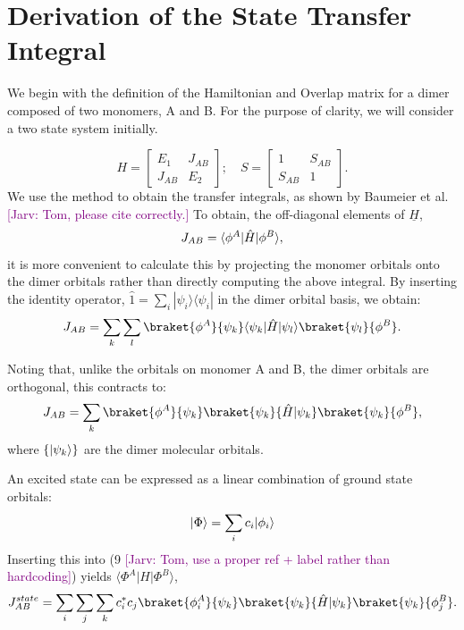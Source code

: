 \documentclass[aps,physrev,reprint,superscriptaddress,nofootinbib,amsmath,amssymb,a4paper]{revtex4-2}
\DeclarePairedDelimiter\bra{\langle}{\rvert}
\DeclarePairedDelimiter\ket{\lvert}{\rangle}
\newcommand{\jarv}[1]{\textcolor{purple}{[Jarv: #1]}}
\begin{document}
\section{Derivation of the State Transfer Integral}\label{Derivation}
We begin with the definition of the Hamiltonian and Overlap matrix for a dimer composed of two monomers, A and B. For the purpose of clarity, we will consider a two state system initially. 


\begin{equation}
    H = 
    \begin{bmatrix}
        E_1&J_{AB}\\
        J_{AB} &E_2
    \end{bmatrix}
    ; \quad  S = 
        \begin{bmatrix}
        1&S_{AB}\\
        S_{AB} &1
    \end{bmatrix}.
\end{equation}
We use the method to obtain the transfer integrals, as shown by Baumeier et al. \jarv{Tom, please cite correctly.} To obtain, the off-diagonal elements of $\underline{H}$,
\begin{equation}
    J_{AB} =\bra{\phi^A}\hat{H}\ket{\phi^B},
\end{equation}
it is more convenient to calculate this by projecting the monomer orbitals onto the dimer orbitals rather than directly computing the above integral. By inserting the identity operator, $\hat{1}= \sum_i|\psi_i\rangle\langle\psi_i|$ in the dimer orbital basis, we obtain:
\begin{equation}
    J_{AB} = \sum_k\sum_l \braket{\phi^A}{\psi_k}\bra{\psi_k}\hat{H}\ket{\psi_l}\braket{\psi_l}{\phi^B}.
\end{equation}

Noting that, unlike the orbitals on monomer A and B, the dimer orbitals are orthogonal, this contracts to:
\begin{equation}
    J_{AB} =\sum_k\braket{\phi^A}{\psi_k}\braket{\psi_k}{\hat{H}|\psi_k}\braket{\psi_k}{\phi^B}, 
\end{equation}
where $\{ \ket{\psi_k} \}$ are the dimer molecular orbitals.

An excited state can be expressed as a linear combination of ground state orbitals:
\begin{equation}
   \ket{ \Phi }= \sum_i c_i \ket{\phi_i}
\end{equation}
Inserting this into (9 \jarv{Tom, use a proper ref + label rather than hardcoding}) yields $\langle\Phi^A|H|\Phi^B\rangle$,
\begin{equation}
    J_{AB}^{state} = \sum_i\sum_j\sum_k c_i^*c_j \braket{\phi^A_i}{\psi_k}\braket{\psi_k}{\hat{H}|\psi_k}\braket{\psi_k}{\phi^B_j}.
\end{equation}
\end{document}

